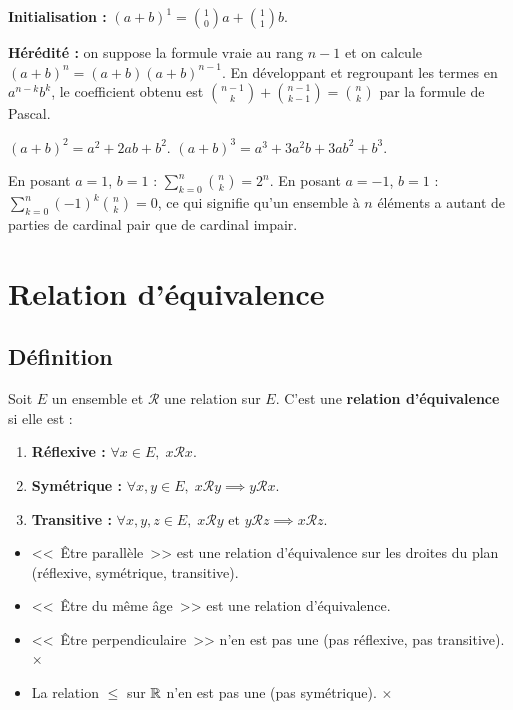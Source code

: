 \begin{proofbox}
\textbf{Initialisation :} $(a+b)^1 = \binom{1}{0}a + \binom{1}{1}b$. \checkmark

\textbf{Hérédité :} on suppose la formule vraie au rang $n-1$ et on calcule $(a+b)^n = (a+b)(a+b)^{n-1}$. En développant et regroupant les termes en $a^{n-k}b^k$, le coefficient obtenu est $\binom{n-1}{k} + \binom{n-1}{k-1} = \binom{n}{k}$ par la formule de Pascal.
\end{proofbox}

\begin{exbox}
$(a+b)^2 = a^2 + 2ab + b^2$. \quad $(a+b)^3 = a^3 + 3a^2b + 3ab^2 + b^3$.

En posant $a = 1$, $b = 1$ : $\sum_{k=0}^n \binom{n}{k} = 2^n$. En posant $a = -1$, $b = 1$ : $\sum_{k=0}^n (-1)^k \binom{n}{k} = 0$, ce qui signifie qu'un ensemble à $n$ éléments a autant de parties de cardinal pair que de cardinal impair.
\end{exbox}


\section{Relation d'équivalence}

\subsection{Définition}

\begin{defbox}
Soit $E$ un ensemble et $\mathcal{R}$ une relation sur $E$. C'est une \textbf{relation d'équivalence} si elle est :
\begin{enumerate}[leftmargin=1.5cm]
  \item \textbf{Réflexive :} $\forall x \in E, \; x \mathcal{R} x$.
  \item \textbf{Symétrique :} $\forall x, y \in E, \; x \mathcal{R} y \implies y \mathcal{R} x$.
  \item \textbf{Transitive :} $\forall x, y, z \in E, \; x \mathcal{R} y \text{ et } y \mathcal{R} z \implies x \mathcal{R} z$.
\end{enumerate}
\end{defbox}

\begin{exbox}
\begin{itemize}[leftmargin=1.5cm]
  \item <<~Être parallèle~>> est une relation d'équivalence sur les droites du plan (réflexive, symétrique, transitive). \checkmark
  \item <<~Être du même âge~>> est une relation d'équivalence. \checkmark
  \item <<~Être perpendiculaire~>> n'en est pas une (pas réflexive, pas transitive). $\times$
  \item La relation $\leqslant$ sur $\mathbb{R}$ n'en est pas une (pas symétrique). $\times$
\end{itemize}
\end{exbox}


